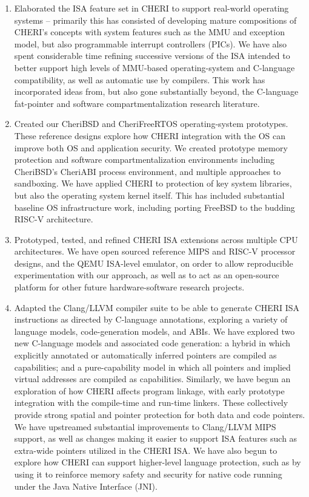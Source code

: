 \begin{enumerate}
\item Elaborated the ISA feature set in CHERI to support real-world operating
  systems -- primarily this has consisted of developing mature compositions of
  CHERI's concepts with system features such as the MMU and exception model,
  but also programmable interrupt controllers (PICs).
  We have also spent considerable time refining successive versions of
  the ISA intended to better support high levels of MMU-based operating-system
  and C-language compatibility, as well as automatic use by compilers.
  This work has incorporated ideas from, but also gone substantially beyond,
  the C-language fat-pointer and software compartmentalization research
  literature.

\item Created our CheriBSD and CheriFreeRTOS operating-system prototypes.
  These reference designs explore how CHERI integration with the OS can
  improve both OS and application security.
  We created prototype memory protection and software compartmentalization
  environments including CheriBSD's CheriABI process environment, and multiple
  approaches to sandboxing.
  We have applied CHERI to protection of key system libraries, but also the
  operating system kernel itself.
  This has included substantial baseline OS infrastructure work, including
  porting FreeBSD to the budding RISC-V architecture.

\item Prototyped, tested, and refined CHERI ISA extensions across multiple CPU
  architectures.
  We have open sourced reference MIPS and RISC-V processor designs, and the
  QEMU ISA-level emulator, on order to allow reproducible experimentation with
  our approach, as well as to act as an open-source platform for other future
  hardware-software research projects.

\item Adapted the Clang/LLVM compiler suite to be able to generate CHERI ISA
  instructions as directed by C-language annotations, exploring a variety of
  language models, code-generation models, and ABIs.
  We have explored two new C-language models and associated code generation:
  a hybrid in which explicitly annotated or automatically inferred pointers
  are compiled as capabilities; and a pure-capability model in which all
  pointers and implied virtual addresses are compiled as capabilities.
  Similarly, we have begun an exploration of how CHERI affects program
  linkage, with early prototype integration with the compile-time and run-time
  linkers.
  These collectively provide strong spatial and pointer protection for both
  data and code pointers.
  We have upstreamed substantial improvements to Clang/LLVM MIPS support, as
  well as changes making it easier to support ISA features such as extra-wide
  pointers utilized in the CHERI ISA.
  We have also begun to explore how CHERI can support higher-level language
  protection, such as by using it to reinforce memory safety and security for
  native code running under the Java Native Interface (JNI).


\end{enumerate}
